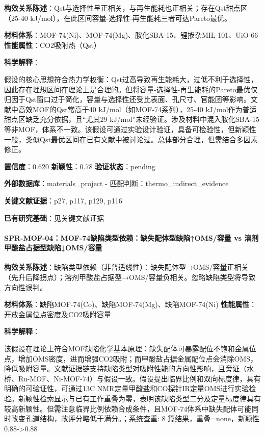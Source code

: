 \documentclass[12pt,a4paper]{ctexart}
\begin{document}
\textbf{构效关系陈述}：Qst与选择性呈正相关，与再生能耗也正相关；存在Qst甜点区（25-40 kJ/mol），在此区间容量-选择性-再生能耗三者可达Pareto最优。

\textbf{材料体系}：MOF-74(Ni)、MOF-74(Mg)、胺化SBA-15、锂掺杂MIL-101、UiO-66 \textbar{} \textbf{性能属性}：CO2吸附热（Qst）

\textbf{科学解释}：

假设的核心思想符合热力学权衡：Qst过高导致再生能耗大，过低不利于选择性，因此存在理想区间在理论上是合理的。但将容量-选择性-再生能耗的Pareto最优仅归因于Qst窗口过于简化，容量与选择性还受比表面、孔尺寸、官能团等影响。文献中高效MOF的Qst常高于40 kJ/mol（如MOF-74系列），25-40 kJ/mol作为普适甜点区缺乏充分依据，且``尤其29 kJ/mol''未经验证。涉及材料中混入胺化SBA-15等非MOF，体系不一致。该假设可通过实验设计验证，具备可检验性，但新颖性一般，类似Qst最优区间在已有文献中被讨论过。总体部分合理，但需结合多因素修正。

\textbf{置信度}：0.620 \textbar{} \textbf{新颖性}：0.78 \textbar{} \textbf{验证状态}：pending

\textbf{外部数据库}：materials\_project - 匹配判断：thermo\_indirect\_evidence

\textbf{关键文献证据}：p27, p117, p129, p116

\textbf{已有研究基础}：见关键文献证据

\paragraph{SPR-MOF-04：MOF-74缺陷类型依赖：缺失配体型缺陷↑OMS/容量 vs 溶剂甲酸盐占据型缺陷↓OMS/容量}\label{spr-mof-04mof-74ux7f3aux9677ux7c7bux578bux4f9dux8d56ux7f3aux5931ux914dux4f53ux578bux7f3aux9677omsux5bb9ux91cf-vs-ux6eb6ux5242ux7532ux9178ux76d0ux5360ux636eux578bux7f3aux9677omsux5bb9ux91cf}

\textbf{构效关系陈述}：缺陷类型依赖（非普适线性）：缺失配体型→OMS/容量正相关（先升后降拐点）；溶剂甲酸盐占据型→OMS/容量负相关。忽略缺陷类型将导致方向性误判。

\textbf{材料体系}：缺陷MOF-74(Co)、缺陷MOF-74(Mg)、缺陷MOF-74(Ni) \textbar{} \textbf{性能属性}：开放金属位点密度及CO2吸附容量

\textbf{科学解释}：

该假设在理论上符合MOF缺陷化学基本原理：缺失配体可暴露配位不饱和金属位点，增加OMS密度，进而增强CO2吸附；而甲酸盐占据金属配位点会消除OMS，降低吸附容量。文献证据链支持缺陷类型对吸附性能的方向性影响，且旁证（水桥、Ru-MOF、Ni-MOF-74）与假设一致。假设提出临界比例和双向标度律，具有明确的可验证性，可通过13C NMR定量甲酸盐和CO探针IR定量OMS进行实验检验。新颖性检索显示与已有工作重叠为零，表明该缺陷类型二分及定量标度律具有较高新颖性。但需注意临界比例依赖合成条件，且MOF-74体系中缺失配体可能同时改变孔道结构，故评分略低于满分。；系统查重: 8 篇结果，重叠=none，新颖性 0.88-\textgreater0.88
\end{document}
